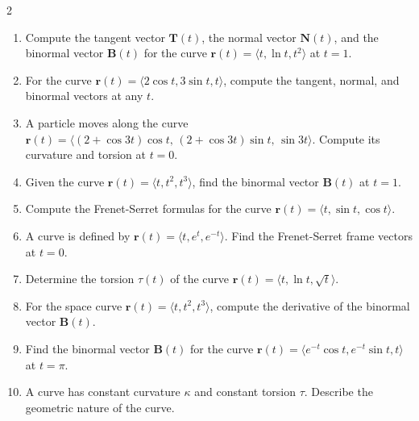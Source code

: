 \begin{multicols}{2}
\begin{enumerate}
    \item Compute the tangent vector \( \mathbf{T}(t) \), the normal vector \( \mathbf{N}(t) \), and the binormal vector \( \mathbf{B}(t) \) for the curve \( \mathbf{r}(t) = \langle t, \ln t, t^2 \rangle \) at \( t = 1 \).
    \item For the curve \( \mathbf{r}(t) = \langle 2\cos t, 3\sin t, t \rangle \), compute the tangent, normal, and binormal vectors at any \( t \).
    \item A particle moves along the curve \( \mathbf{r}(t) = \langle (2+\cos 3t)\cos t,\, (2+\cos 3t)\sin t,\, \sin 3t \rangle \). Compute its curvature and torsion at \( t = 0 \).
    \item Given the curve \( \mathbf{r}(t) = \langle t, t^2, t^3 \rangle \), find the binormal vector \( \mathbf{B}(t) \) at \( t = 1 \).
    \item Compute the Frenet-Serret formulas for the curve \( \mathbf{r}(t) = \langle t, \sin t, \cos t \rangle \).
    \item A curve is defined by \( \mathbf{r}(t) = \langle t, e^t, e^{-t} \rangle \). Find the Frenet-Serret frame vectors at \( t = 0 \).
    \item Determine the torsion \( \tau(t) \) of the curve \( \mathbf{r}(t) = \langle t, \ln t, \sqrt{t} \rangle \).
    \item For the space curve \( \mathbf{r}(t) = \langle t, t^2, t^3 \rangle \), compute the derivative of the binormal vector \( \mathbf{B}(t) \).
    \item Find the binormal vector \( \mathbf{B}(t) \) for the curve \( \mathbf{r}(t) = \langle e^{-t}\cos t, e^{-t}\sin t, t \rangle \) at \( t = \pi \).
    \item A curve has constant curvature \( \kappa \) and constant torsion \( \tau \). Describe the geometric nature of the curve.


\end{enumerate}
\end{multicols}
